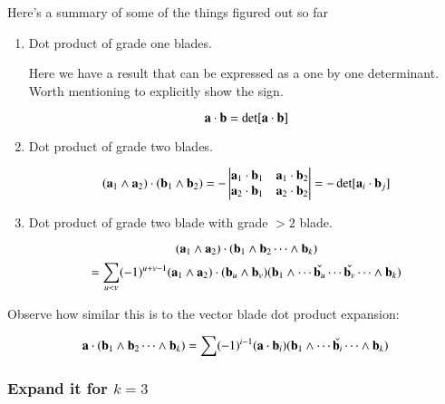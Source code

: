 \documentclass{article}      %
\newcommand{\Det}[1] {\abs{#1}}
\begin{document}
Here's a summary of some of the things figured out so far

\begin{enumerate}
\item Dot product of grade one blades.

Here we have a result that can be expressed as a one by one determinant.  Worth mentioning to explicitly show the sign.

\begin{equation}\label{eqn:dotoneblades}
\mathbf{a} \cdot \mathbf{b} = \det[\mathbf{a} \cdot \mathbf{b}]
\end{equation}

\item Dot product of grade two blades.

\begin{equation}\label{eqn:k2k2dot}
(\mathbf{a}_1 \wedge \mathbf{a}_2) \cdot (\mathbf{b}_1 \wedge \mathbf{b}_2)
=
-
\begin{vmatrix}
\mathbf{a}_1 \cdot \mathbf{b}_1 & \mathbf{a}_1 \cdot \mathbf{b}_2 \\
\mathbf{a}_2 \cdot \mathbf{b}_1 & \mathbf{a}_2 \cdot \mathbf{b}_2 \\
\end{vmatrix}
=
-\det[\mathbf{a}_i \cdot \mathbf{b}_j]
\end{equation}

\item Dot product of grade two blade with grade $>2$ blade.

\begin{equation*}
(\mathbf{a}_{1} \wedge \mathbf{a}_2) \cdot (\mathbf{b}_1 \wedge \mathbf{b}_2 \cdots \wedge \mathbf{b}_k)
\end{equation*}
\begin{equation}\label{eqn:bivectordot}
= 
\sum_{u<v} (-1)^{u+v-1} 
(\mathbf{a}_1 \wedge \mathbf{a}_2) \cdot (\mathbf{b}_u \wedge \mathbf{b}_v)
(\mathbf{b}_1 \wedge \cdots \check{\mathbf{b}_u} \cdots \check{\mathbf{b}_v} \cdots \wedge \mathbf{b}_k) 
\end{equation}
\end{enumerate}

Observe how similar this is to the vector blade dot product expansion:

\begin{equation}\label{eqn:vectordot}
\mathbf{a} \cdot (\mathbf{b}_1 \wedge \mathbf{b}_2 \cdots \wedge \mathbf{b}_k)
= 
\sum (-1)^{i-1} 
(\mathbf{a} \cdot \mathbf{b}_i) (\mathbf{b}_1 \wedge \cdots \check{\mathbf{b}_i} \cdots \wedge \mathbf{b}_k) 
\end{equation}

\subsubsection{ Expand it for $k=3$ }
\end{document}
